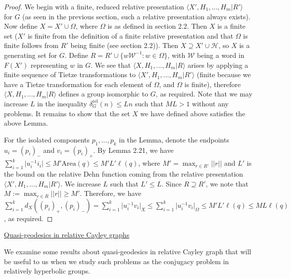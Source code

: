 \documentclass[12pt]{article}
\newcommand{\vs}{\vskip10pt}
\begin{document}
	\begin{proof}
		
		We begin with a finite, reduced relative presentation $\langle X', H_1,...,H_m \vert R' \rangle$ for $G$ (as seen in the previous section, such a relative presentation always exists). Now define $X = X' \cup \Omega$, where $\Omega$ is as defined in section 2.2. Then $X$ is a finite set ($X'$ is finite from the definition of a finite relative presentation and that $\Omega$ is finite follows from $R'$ being finite (see section 2.2)). Then $X \supseteq X' \cup \mathcal{H}$, so $X$ is a generating set for $G$. Define $R = R' \cup \{w \mathcal{W}^{-1}: w \in \Omega\}$, with $\mathcal{W}$ being a word in $F(X')$ representing $w$ in $G$. We see that $\langle X, H_1,...,H_m \vert R \rangle$ arises by applying a finite sequence of Tietze transformations to $\langle X', H_1,...,H_m \vert R' \rangle$ (finite because we have a Tietze transformation for each element of $\Omega$, and $\Omega$ is finite), therefore $\langle X, H_1,...,H_m \vert R \rangle$ defines a group isomorphic to $G$, as required. Note that we may increase $L$ in the inequality $\delta^{\text{rel}}_G(n) \leq Ln$ such that $ML > 1$ without any problems. It remains to show that the set $X$ we have defined above satisfies the above Lemma. 
		
		\vs 
		
		For the isolated components $p_1,...,p_k$ in the Lemma, denote the endpoints $u_i = (p_i)_-$ and $v_i = (p_i)_+$. By Lemma 2.21, we have $\sum_{i = 1}^k \vert u_i^{-1} i_i \vert \leq M' \text{Area}(q) \leq M' L' \ell(q)$, where $M' = \max_{r \in R'} \vert \vert r \vert \vert$ and $L'$ is the bound on the relative Dehn function coming from the relative presentation $\langle X', H_1,...,H_m \vert R' \rangle$. We increase $L$ such that $L' \leq L$. Since $R \supseteq R'$, we note that $M:= \max_{r \in R} \vert \vert r \vert \vert \geq M'$. Therefore, we have $\sum_{i=1}^k d_X((p_i)_+, (p_i)_-) = \sum_{i=1}^k \vert u_i^{-1} v_i \vert_X \leq \sum_{i=1}^k \vert u_i^{-1}v_i \vert_{\Omega} \leq M' L' \ell(q) \leq ML \ell(q)$, as required. 
		
	\end{proof}
	
	\vs
	
	\underline{Quasi-geodesics in relative Cayley graphs}
	
	\vs
	
	We examine some results about quasi-geodesics in relative Cayley graph that will be useful to us when we study such problems as the conjugacy problem in relatively hyperbolic groups. 
	
\end{document}
